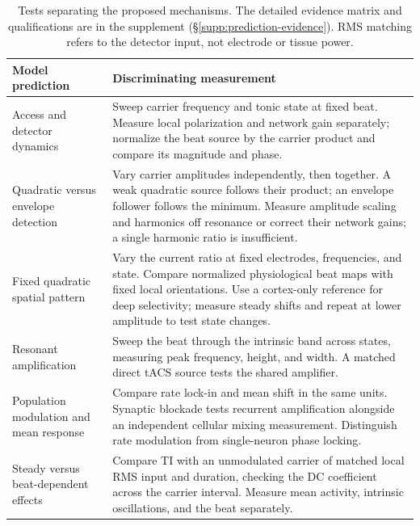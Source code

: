 \documentclass[11pt,a4paper]{article}
\begin{document}
\begin{table}[htbp]
\centering\small
\renewcommand{\arraystretch}{1.15}
\begin{tabular}{@{}>{\raggedright\arraybackslash}p{}
 >{\raggedright\arraybackslash}p{}@{}}
\toprule
Model prediction & Discriminating measurement \\
\midrule
Access and detector dynamics & Sweep carrier frequency and tonic state at fixed
beat. Measure local polarization and network gain separately; normalize the
beat source by the carrier product and compare its magnitude and phase. \\[4pt]
Quadratic versus envelope detection & Vary carrier amplitudes independently,
then together. A weak quadratic source follows their product; an envelope
follower follows the minimum. Measure amplitude scaling and harmonics off
resonance or correct their network gains; a single harmonic ratio is insufficient. \\[4pt]
Fixed quadratic spatial pattern & Vary the current ratio at fixed electrodes,
frequencies, and state. Compare normalized physiological beat maps with fixed
local orientations. Use a cortex-only reference for deep selectivity; measure
steady shifts and repeat at lower amplitude to test state changes. \\[4pt]
Resonant amplification & Sweep the beat through the intrinsic band across
states, measuring peak frequency, height, and width. A matched direct tACS
source tests the shared amplifier. \\[4pt]
Population modulation and mean response & Compare rate lock-in and mean shift
in the same units. Synaptic blockade tests recurrent amplification alongside
an independent cellular mixing measurement. Distinguish rate modulation from
single-neuron phase locking. \\[4pt]
Steady versus beat-dependent effects & Compare TI with an unmodulated carrier
of matched local RMS input and duration, checking the DC coefficient across
the carrier interval. Measure mean activity, intrinsic oscillations, and the
beat separately. \\
\bottomrule
\end{tabular}
\caption{Tests separating the proposed mechanisms. The detailed evidence matrix
and qualifications are in the supplement (\S\ref{supp:prediction-evidence}).
RMS matching refers to the detector input, not electrode or tissue power.}
\label{tab:predictions}
\end{table}
\end{document}
